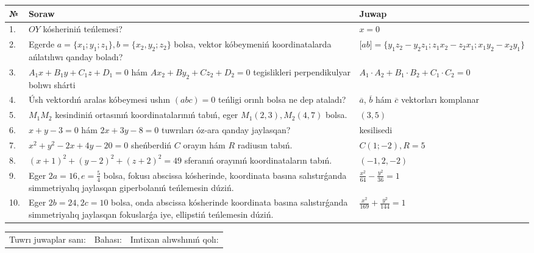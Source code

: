 \documentclass{article}
\begin{document}
\begin{tabular}{|m{0.7cm}|m{10cm}|m{4cm}|}
\hline
№ & Soraw & Juwap \\
\hline
1. & $OY$ kósheriniń teńlemesi? & $x=0$ \\
\hline
2. & Egerde $a=\{ x_1; y_1; z_1\}, b=\{ x_2, y_2; z_2\}$ bolsa, vektor kóbeymeniń koordinatalarda ańlatılıwı qanday boladı? &  $\lbrack ab\rbrack=\{y_1z_2-y_2z_1; z_1x_2-z_2x_1; x_1y_2-x_2y_1\}$ \\
\hline
3. & $A_1x+B_1y+C_1z+D_1=0$ hám $Ax_2+By_2+Cz_2+D_2=0$ tegislikleri perpendikulyar bolıwı shárti & $A_1\cdot A_2+B_1\cdot B_2+C_1\cdot C_2=0$ \\
\hline
4. & Úsh vektordıń aralas kóbeymesi ushın $(abc)=0$ teńligi orınlı bolsa ne dep ataladı? & $\overline{a}$, $\overline{b}$ hám $\overline{c}$ vektorları komplanar \\
\hline
5. & $M_{1}M_{2}$ kesindiniń ortasınıń koordinatalarınıń tabıń, eger $M_{1} (2, 3), M_{2} (4, 7)$ bolsa. & $(3,5)$ \\
\hline
6. & $x+y-3=0$ hám $2x+3y-8=0$ tuwrıları óz-ara qanday jaylasqan? & kesilisedi \\
\hline
7. & $x^{2}+y^{2}-2x+4y-20=0$ sheńberdiń $C$ orayın hám $R$ radiusın tabıń. & $C(1;-2), R=5$ \\
\hline
8. & $(x+1)^{2}+(y-2) ^{2}+(z+2) ^{2}=49$ sferanıń orayınıń koordinataların tabıń. & $(-1,2,-2)$ \\
\hline
9. & Eger $2a=16, e=\frac{5}{4}$ bolsa, fokusı abscissa kósherinde, koordinata basına salıstırǵanda simmetriyalıq jaylasqan giperbolanıń teńlemesin dúziń. & $\frac{x^{2}}{64}-\frac{y^{2}}{36}=1$ \\
\hline
10. & Eger $2b=24, 2 c=10$ bolsa, onda abscissa kósherinde koordinata basına salıstırǵanda simmetriyalıq jaylasqan fokuslarǵa iye, ellipstiń teńlemesin dúziń. & $\frac{x^{2}}{169}+\frac{y^{2}}{144}=1$ \\
\hline
\end{tabular}

\vspace{1cm}

\begin{tabular}{lll}
Tuwrı juwaplar sanı: \underline{\hspace{1.5cm}} & 
Bahası: \underline{\hspace{1.5cm}} & 
Imtixan alıwshınıń qolı: \underline{\hspace{2cm}} \\
\end{tabular}
\end{document}
